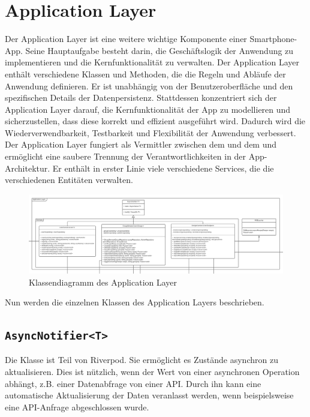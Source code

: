 \documentclass{entwurfsheft}
\begin{document}
\begin{sloppypar}
\section{Application Layer}
Der Application Layer ist eine weitere wichtige Komponente einer Smartphone-App. Seine Hauptaufgabe besteht darin, die Geschäftslogik der Anwendung zu implementieren und die Kernfunktionalität zu verwalten. Der Application Layer enthält verschiedene Klassen und Methoden, die die Regeln und Abläufe der Anwendung definieren. Er ist unabhängig von der Benutzeroberfläche und den spezifischen Details der Datenpersistenz. Stattdessen konzentriert sich der Application Layer darauf, die Kernfunktionalität der App zu modellieren und sicherzustellen, dass diese korrekt und effizient ausgeführt wird. Dadurch wird die Wiederverwendbarkeit, Testbarkeit und Flexibilität der Anwendung verbessert. Der Application Layer fungiert als Vermittler zwischen dem  und dem  und ermöglicht eine saubere Trennung der Verantwortlichkeiten in der App-Architektur.
Er enthält in erster Linie viele verschiedene Services, die die verschiedenen Entitäten verwalten.
\begin{figure}[htp]
    \centering
    \includegraphics[width = \textwidth]{images/applicationLayer/applicationLayer.pdf}
    \caption{Klassendiagramm des Application Layer}
    \label{fig:application-layer}
\end{figure}

Nun werden die einzelnen Klassen des Application Layers beschrieben.
\newpage
\subsection{\texttt{AsyncNotifier<T>}}
\label{sec:asyncNotifier}
Die Klasse ist Teil von Riverpod. Sie ermöglicht es Zustände asynchron zu aktualisieren. Dies ist nützlich, wenn der Wert von einer asynchronen Operation abhängt, z.B. einer Datenabfrage von einer API. Durch ihn kann eine automatische Aktualisierung der Daten veranlasst werden, wenn beispielsweise eine API-Anfrage abgeschlossen wurde.

\end{sloppypar}
\end{document}
